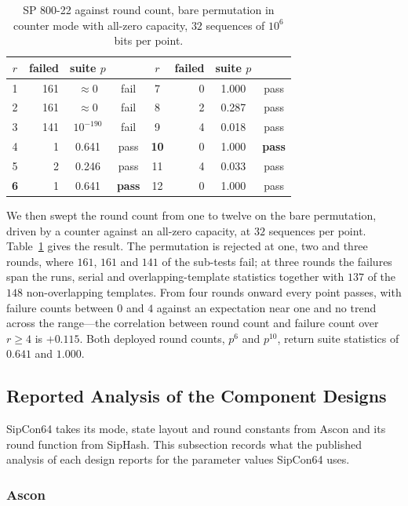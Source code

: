 \begin{table}[!t]
\centering
\caption{SP 800-22 against round count, bare permutation in counter mode with
all-zero capacity, $32$ sequences of $10^{6}$ bits per point.}
\label{tab:sweep}
\small
\begin{tabular}{crcc@{\qquad}crcc}
\hline
$r$ & failed & suite $p$ & & $r$ & failed & suite $p$ &\\
\hline
1 & 161 & $\approx 0$ & fail & 7 & 0 & 1.000 & pass\\
2 & 161 & $\approx 0$ & fail & 8 & 2 & 0.287 & pass\\
3 & 141 & $10^{-190}$ & fail & 9 & 4 & 0.018 & pass\\
4 & 1 & 0.641 & pass & \textbf{10} & 0 & 1.000 & \textbf{pass}\\
5 & 2 & 0.246 & pass & 11 & 4 & 0.033 & pass\\
\textbf{6} & 1 & 0.641 & \textbf{pass} & 12 & 0 & 1.000 & pass\\
\hline
\end{tabular}
\end{table}

We then swept the round count from one to twelve on the bare permutation,
driven by a counter against an all-zero capacity, at $32$ sequences per point.
Table~\ref{tab:sweep} gives the result. The permutation is rejected at one, two
and three rounds, where $161$, $161$ and $141$ of the sub-tests fail; at three
rounds the failures span the runs, serial and overlapping-template statistics
together with $137$ of the $148$ non-overlapping templates. From four rounds
onward every point passes, with failure counts between $0$ and $4$ against an
expectation near one and no trend across the range---the correlation between
round count and failure count over $r \ge 4$ is $+0.115$. Both deployed round
counts, $p^{6}$ and $p^{10}$, return suite statistics of $0.641$ and $1.000$.

\subsection{Reported Analysis of the Component Designs}
\label{sec:sec-parents}

SipCon64 takes its mode, state layout and round constants from Ascon and its
round function from SipHash. This subsection records what the published
analysis of each design reports for the parameter values SipCon64 uses.

\subsubsection{Ascon}

